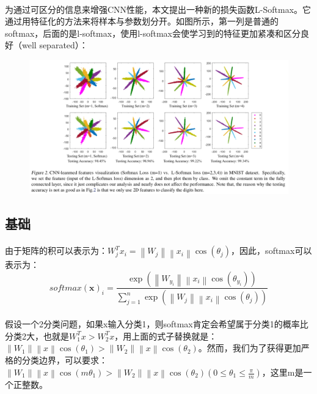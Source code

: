 \documentclass[10pt,letterpaper]{article}
\begin{document}
\paragraph{} 为通过可区分的信息来增强CNN性能，本文提出一种新的损失函数L-Softmax。它通过用特征化的方法来将样本与参数划分开。如图所示，第一列是普通的softmax，后面的是l-softmax，使用l-softmax会使学习到的特征更加紧凑和区分良好（well separated）：
\begin{figure}[H]
	\centering
	\includegraphics[width=1\textwidth]{../images/l-softmax.png}
	\caption{}
	\label{l-softmax}
\end{figure}

\subsection{基础}
\paragraph{} 由于矩阵的积可以表示为：$W_j^Tx_i = \left \| W_j \right \|\left \| x_i \right \|\cos(\theta_j)$，因此，softmax可以表示为：
\begin{equation}
	softmax(\mathbf{x})_i = \frac{\exp(\left \| W_{y_i} \right \|\left \| x_i \right \|\cos(\theta_{y_i}))}{\sum^n_{j=1}\exp(\left \| W_j \right \|\left \| x_i \right \|\cos(\theta_j))}
\end{equation}
\paragraph{} 假设一个2分类问题，如果x输入分类1，则softmax肯定会希望属于分类1的概率比分类2大，也就是$W_1^Tx > W_2^Tx$，用上面的式子替换就是：$\left \| W_1 \right \|\left \| x \right \|\cos(\theta_1) > \left \| W_2 \right \|\left \| x \right \|\cos(\theta_2)$。然而，我们为了获得更加严格的分类边界，可以要求：$\left \| W_1 \right \|\left \| x \right \|\cos(m\theta_1) > \left \| W_2 \right \|\left \| x \right \|\cos(\theta_2) (0 \leq \theta_1 \leq \frac{\pi}{m} )$，这里m是一个正整数。
\end{document}
